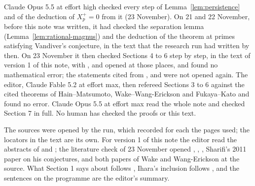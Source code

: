 \documentclass[11pt]{article}
\theoremstyle{definition}
\numberwithin{equation}{section}
\begin{document}
Claude Opus 5.5 at effort high checked every step of Lemma~\ref{lem:persistence} and of the deduction of
$X_p^+=0$ from it (23 November). On 21 and 22 November, before this note was written, it had checked the
separation lemma (Lemma~\ref{lem:rational-magnus}) and the deduction of the theorem at primes satisfying
Vandiver's conjecture, in the text that the research run had written by then. On 23 November it then checked
Sections 4 to 6 step by step, in the text of version 1 of this note, with
\cite[Proposition~2.2.6]{WakeWangErickson2017}, \cite[Corollary~2.1.3, Conjecture~2.1.5 and
Corollary~8.1.3(2)]{WakeWangEricksonPseudo2018} and \cite[\S6.1.5 and \S\S7.1.9--7.1.10]{FukayaKato2012} opened at
those places, and found no mathematical error; the statements cited from \cite{MilneLEC2013},
\cite{SharifiIwasawaNotes} and \cite{Iwasawa1981} were not opened again. The editor, Claude Fable 5.2 at effort max, then refereed
Sections 3 to 6 against the cited theorems of Hain--Matsumoto, Wake--Wang-Erickson and Fukaya--Kato and found no error. Claude Opus 5.5 at effort max read the whole note and checked Section 7 in full. No human has checked the proofs or this text.

The sources were opened by the run, which recorded for each the pages used; the locators in the text are its
own. For version 1 of this note the editor read the abstracts of \cite{Sharifi2002} and \cite{IshiiKernel2026}; the literature
check of 23 November opened \cite{Sharifi2002}, \cite{Sharifi2019}, \cite{IshiiKernel2026}, Sharifi's 2011
paper on his conjectures, \cite{FukayaKato2012} and both papers of Wake and Wang-Erickson at the source. What
Section 1 says about \cite{AndersonIhara1988} follows \cite[p.~2]{IshiiKernel2026}, Ihara's inclusion follows
\cite[p.~1]{Sharifi2002}, and the sentences on the programme are the editor's summary.
\end{document}
